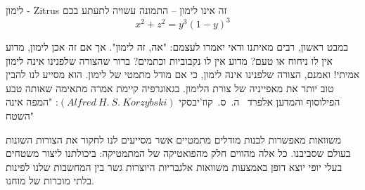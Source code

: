\begin{surferPage}[%
לימון%
]{%
לימון - Zitrus%
}
זה אינו לימון – התמונה עשויה לתעתע בכם\\
\smallskip
\[x^2 + z^2 = y^3 (1 - y)^3\]


\singlespacing
במבט ראשון, רבים מאיתנו ודאי יאמרו לעצמם: "אה, זה לימון". אך אם זה אכן לימון, מדוע אין לו ניחוח או טעם? מדוע אין לו נקבוביות וכתמים? ברור שהצורה שלפנינו אינה לימון אמיתי!
\singlespacing
ואמנם, הצורה שלפנינו אינה לימון, כי אם מודל מתמטי של לימון. הוא מסייע לנו להבין טוב יותר את מאפייניה של צורת הלימון. בגאוגרפיה קיימת אמרה מתאימה שאותה טבע הפילוסוף והמדען אלפרד \ ה.\ ס.\ קוז'יבסקי $(Alfred\ H.\ S.\ Korzybski)$: "המפה אינה השטח" \\
\singlespacing

משוואות מאפשרות לבנות מודלים מתמטיים אשר מסייעים לנו לחקור את הצורות השונות בעולם שסביבנו.
\singlespacing
כל אלה מהווים חלק מהפואטיקה של המתמטיקה: ביכולתנו ליצור משטחים בעלי יופי יוצא דופן באמצעות משוואות אלגבריות היוצרות גשר בין המחשבות שלנו לפינות בלתי מוכרות של מוחנו.
\end{surferPage}
